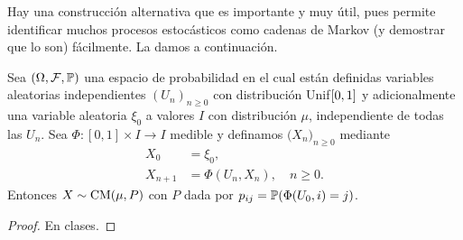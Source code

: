 Hay una construcción alternativa que es importante y muy útil, pues permite identificar muchos procesos estocásticos como cadenas de Markov (y demostrar que lo son) fácilmente.
La damos a continuación.

\begin{thm}
Sea $(\Omega,\mathcal{F},\mathbb{P})$ una espacio de probabilidad en el cual están definidas variables aleatorias independientes $(U_n)_{n\geq0}$ con distribución Unif$\hspace{0.1em}[0,1]$ y adicionalmente una variable aleatoria $\xi_0$ a valores $I$ con distribución $\mu$, independiente de todas las $U_n$.
Sea $\Phi\!:\![0,1]\times I\longrightarrow I$ medible y definamos $\big(X_n\big)_{n\geq0}$ mediante
\begin{equation}
\begin{aligned}
X_0&=\xi_0,\\
X_{n+1}&=\Phi(U_n,X_n),\quad n\geq0.
\end{aligned}\label{eq:constrDirMarkov}
\end{equation}
Entonces $X\sim\text{\upshape{CM}}(\mu,P)$ con $P$ dada por $p_{ij}=\mathbb{P}(\Phi(U_0,i)=j)$.
\end{thm}

\begin{proof}
En clases. \ucmark
\end{proof}

